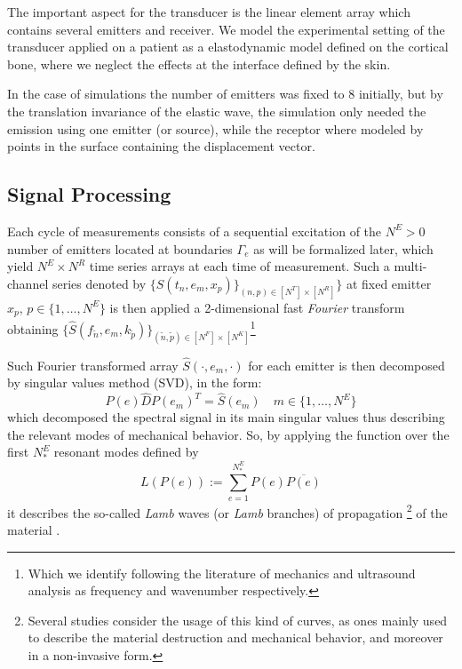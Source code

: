 The important aspect for the transducer is the linear element array which contains several emitters and receiver. We model the experimental setting of the transducer applied on a patient as a elastodynamic model defined on the cortical bone, where we neglect the effects at the interface defined by the skin. 

In the case of simulations the number of emitters was fixed to 8 initially, but by the translation invariance of the elastic wave, the simulation only needed the emission using one emitter (or source), while the receptor where modeled by points in the surface containing the displacement vector.

\subsection{Signal Processing}
Each cycle of measurements consists of a sequential excitation of the $N^E > 0$ number of emitters located at boundaries $\Gamma_{e}$ as will be formalized later, which yield $N^E \times N^R$ time series arrays at each time of measurement.
Such a multi-channel series denoted by $\{ S(t_n, e_m,x_p) \}_{(n,p) \in [N^T]\times [N^R]}\}$ at fixed emitter $x_p, \, p \in \{1, \dots, N^E\}$ is then applied a 2-dimensional fast \textit{Fourier} transform obtaining $\{ \hat{S}(f_{\tilde{n}},e_m,k_{\tilde{p}}) \}_{(\tilde{n},\tilde{p}) \in [N^F]\times [N^K]}$\footnote{Which we identify following the literature of mechanics and ultrasound analysis as frequency and wavenumber respectively.}

Such Fourier transformed array $\hat{S}(\cdot, e_m, \cdot)$ for each emitter is then decomposed by singular values method (SVD), in the form:
\begin{equation*}
    P(e) \hat{D} P(e_m)^T = \hat{S}(e_m) \quad m \in \{1, \dots, N^E \}
\end{equation*}
which decomposed the spectral signal in its main singular values thus describing the relevant modes of mechanical behavior.
So, by applying the function over the first $N^E_*$ resonant modes defined by
\begin{equation*}
    L(P(e)) := \sum \limits_{e = 1}^{N^E_*} P(e) \overline{P(e)}
\end{equation*}
it describes the so-called \textit{Lamb} waves (or \textit{Lamb} branches) of propagation \footnote{Several studies consider the usage of this kind of curves, as ones mainly used to describe the material destruction and mechanical behavior, and moreover in a non-invasive form.} of the material \cite{Rhee2007}.

